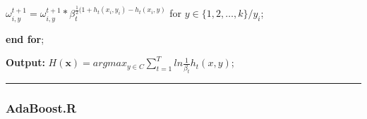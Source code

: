 \documentclass[a4paper]{article}
\begin{document}
							\hspace*{48pt} $\omega_{i,y}^{t+1} = \omega_{i,y}^{t+1}*\beta_t^{\frac{1}{2}(1+h_t(x_i,y_i)-h_t(x_i,y)}$ for $y\in \{1,2,\dots,k\}\slash{y_i}$;\par
					\hspace*{32pt}\textbf{end for};\par
			\textbf{Output:} $H(\textbf{x}) = argmax_{y\in C}\sum_{t=1}^{T}ln\frac{1}{\beta_t}h_t(x,y)$;\par
			\noindent\rule[0.1\baselineskip]{\textwidth}{0.75pt}\par
		\subsubsection{AdaBoost.R}
\end{document}
